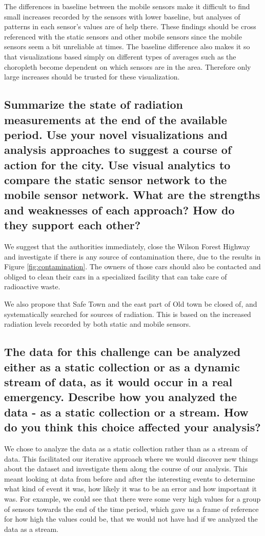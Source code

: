 \documentclass[journal]{vgtc}                %
\begin{document}
The differences in baseline between the mobile sensors make it difficult to find small increases recorded by the sensors with lower baseline, but analyses of patterns in each sensor's values are of help there. These findings should be cross referenced with the static sensors and other mobile sensors since the mobile sensors seem a bit unreliable at times. The baseline difference also makes it so that visualizations based simply on different types of averages such as the choropleth become dependent on which sensors are in the area. Therefore only large increases should be trusted for these visualization.

\subsection{Summarize the state of radiation measurements at the end of the available period. Use your novel visualizations and analysis approaches to suggest a course of action for the city. Use visual analytics to compare the static sensor network to the mobile sensor network. What are the strengths and weaknesses of each approach? How do they support each other?
}

We suggest that the authorities immediately, close the Wilson Forest Highway and investigate if there is any source of contamination there, due to the results in Figure \ref{fig:contamination}. The owners of those cars should also be contacted and obliged to clean their cars in a specialized facility that can take care of radioactive waste. 

We also propose that Safe Town and the east part of Old town be closed of, and systematically searched for sources of radiation. This is based on the increased radiation levels recorded by both static and mobile sensors.

\subsection{The data for this challenge can be analyzed either as a static collection or as a dynamic stream of data, as it would occur in a real emergency. Describe how you analyzed the data - as a static collection or a stream. How do you think this choice affected your analysis? 
}

We chose to analyze the data as a static collection rather than as a stream of data. This facilitated our iterative approach where we would discover new things about the dataset and investigate them along the course of our analysis. This meant looking at data from before and after the interesting events to determine what kind of event it was, how likely it was to be an error and how important it was. For example, we could see that there were some very high values for a group of sensors towards the end of the time period, which gave us a frame of reference for how high the values could be, that we would not have had if we analyzed the data as a stream.
\end{document}
